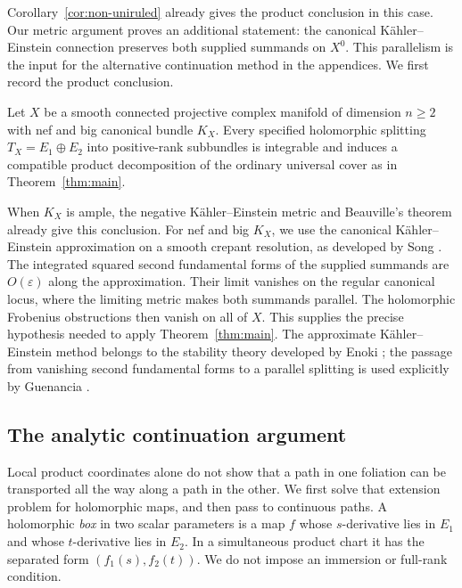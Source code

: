 Corollary~\ref{cor:non-uniruled} already gives the product conclusion
in this case. Our metric argument proves an additional statement:
the canonical K\"ahler--Einstein connection preserves both supplied
summands on $X^0$. This parallelism is the input for the alternative
continuation method in the appendices. We first record the product
conclusion.

\begin{corollary}\label{thm:nef-big}
Let $X$ be a smooth connected projective complex manifold of dimension
$n\geq2$ with nef and big canonical bundle $K_X$. Every specified
holomorphic splitting $T_X=E_1\oplus E_2$ into positive-rank subbundles
is integrable and induces a compatible product decomposition of the
ordinary universal cover as in Theorem~\ref{thm:main}.
\end{corollary}

When $K_X$ is ample, the negative K\"ahler--Einstein metric and
Beauville's theorem already give this conclusion. For nef and big $K_X$,
we use the canonical K\"ahler--Einstein approximation on a smooth
crepant resolution, as developed by Song \cite{Song14}.
The integrated squared second fundamental forms of the supplied summands
are $O(\varepsilon)$ along the approximation. Their limit vanishes on
the regular canonical locus, where the limiting metric makes both
summands parallel. The holomorphic Frobenius obstructions then vanish
on all of $X$. This supplies the precise hypothesis needed to apply
Theorem~\ref{thm:main}.
The approximate K\"ahler--Einstein method belongs to the stability
theory developed by Enoki \cite{Enoki88}; the passage from vanishing
second fundamental forms to a parallel splitting is used explicitly
by Guenancia \cite[Section~3.4, Step~4]{Guenancia16}.

\subsection*{The analytic continuation argument}

Local product coordinates alone do not show that a path in one foliation
can be transported all the way along a path in the other. We first solve
that extension problem for holomorphic maps, and then pass to continuous
paths. A holomorphic \emph{box} in two scalar parameters is a map $f$
whose $s$-derivative lies in $E_1$ and whose $t$-derivative lies in $E_2$.
In a simultaneous product chart it has the separated form
$(f_1(s),f_2(t))$. We do not impose an immersion or full-rank condition.

